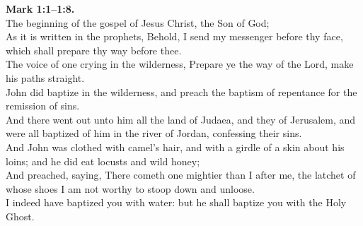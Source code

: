 \documentclass[12pt]{article} %
\begin{document}
{\begin{minipage}[t]{0.45\textwidth}
\textbf{Mark 1:1--1:8.}\\
The beginning of the gospel of Jesus Christ, the Son of God;\\
As it is written in the prophets, Behold, I send my messenger before thy face, which shall prepare thy way before thee.\\
The voice of one crying in the wilderness, Prepare ye the way of the Lord, make his paths straight.\\
John did baptize in the wilderness, and preach the baptism of repentance for the remission of sins.\\
And there went out unto him all the land of Judaea, and they of Jerusalem, and were all baptized of him in the river of Jordan, confessing their sins.\\
And John was clothed with camel's hair, and with a girdle of a skin about his loins; and he did eat locusts and wild honey;\\
And preached, saying, There cometh one mightier than I after me, the latchet of whose shoes I am not worthy to stoop down and unloose.\\
I indeed have baptized you with water: but he shall baptize you with the Holy Ghost.\\

\end{minipage}}
\vspace*{\fill}
\newpage
\Huge%
\vspace*{\fill}
\begin{spacing}{1.2}
\end{spacing}
\vspace*{\fill}
\end{document}
